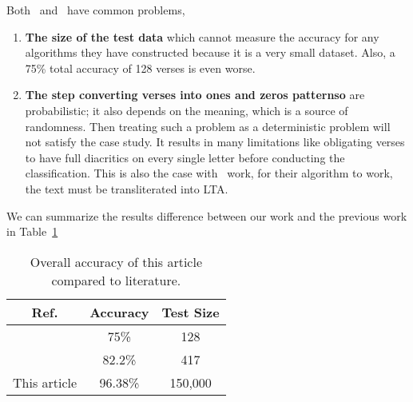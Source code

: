Both~\cite{Abuata2016RuleBasedAlgorithmFor} and~\cite{Alnagdawi2013FindingArabicPoemMeter} have common problems,

\begin{enumerate}
\item \textbf{The size of the test data} which cannot measure the accuracy for any algorithms they have constructed because it is a very small dataset. Also, a 75\% total accuracy of 128 verses is even worse.
  \item \textbf{The step converting verses into ones and zeros patternso} are probabilistic; it also depends on the meaning, which is a source of randomness. Then treating such a problem as a deterministic problem will not satisfy the case study. It results in many limitations like obligating verses to have full diacritics on every single letter before conducting the classification. This is also the case with~\cite{Kurt2012AlgorithmForDetectionAnalysis} work, for their algorithm to work, the text must be transliterated into LTA.
  \end{enumerate}

  We can summarize the results difference between our work and the previous work in Table~\ref{Tab:Summary_Results}

  \begin{table}[h]
  \centering
  \begin{tabular}{c c c}
    \toprule
    \textbf{Ref.}& \textbf{Accuracy}& \textbf{Test Size} \\
    \midrule
    \cite{Alnagdawi2013FindingArabicPoemMeter}   & 75\%     & 128\\
    \cite{Abuata2016RuleBasedAlgorithmFor}      & 82.2\%   & 417  \\
    This article   & 96.38\%  & 150,000 \\
    \bottomrule
  \end{tabular}
  \caption{Overall accuracy of this article compared to literature.}\label{Tab:Summary_Results}
\end{table}




